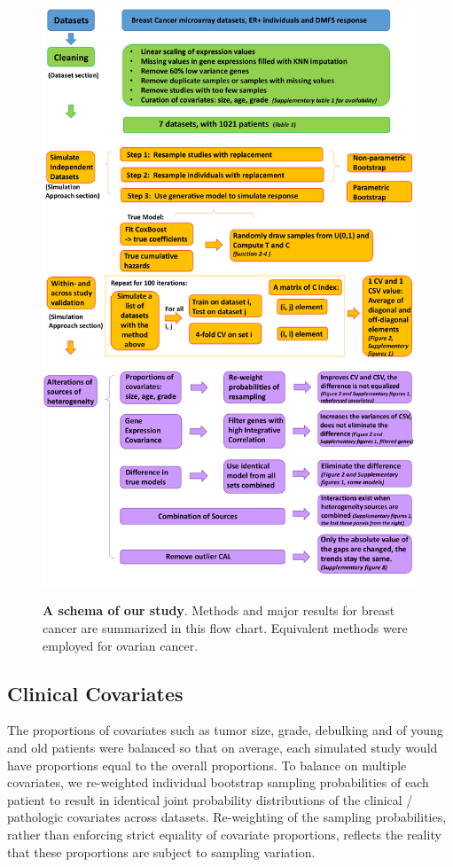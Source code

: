 \documentclass{bioinfo}
\begin{document}
\begin{figure}[htp]
    \centering
    \includegraphics[width=12.5cm]{schema_update_new_allpanels.pdf}\\
    \caption{\textbf{A schema of our study}. Methods and major results for breast cancer are summarized in this flow chart. Equivalent methods were employed for ovarian cancer. }
    \label{scheme}
  \end{figure}

  \subsection{Clinical Covariates}

  The proportions of covariates such as tumor size, grade, debulking and of young and old
  patients were balanced so that on average, each simulated study would have
  proportions equal to the overall proportions.  To
  balance on multiple covariates, we re-weighted individual bootstrap
  sampling probabilities of each patient to result in identical joint
  probability distributions of the clinical / pathologic covariates
  across datasets.  Re-weighting of the sampling probabilities, rather
  than enforcing strict equality of covariate proportions, reflects
  the reality that these proportions are subject to sampling
  variation.
\end{document}
